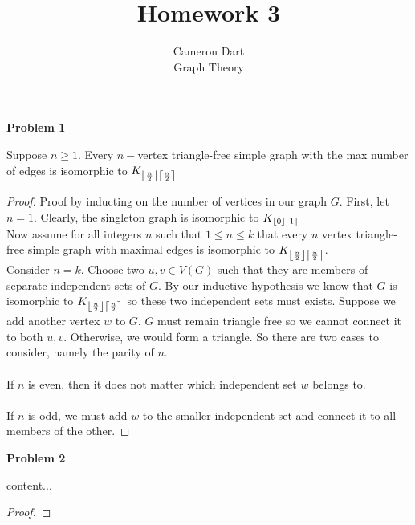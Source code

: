 \documentclass{article}
\newcommand{\K}[2]{K_{\floor*{#1} \ceil*{#2}}}
\DeclarePairedDelimiter\ceil{\lceil}{\rceil}
\DeclarePairedDelimiter\floor{\lfloor}{\rfloor}
\newenvironment{claim}[2][Claim]{\begin{trivlist}
		\item[\hskip \labelsep {\bfseries #1}\hskip \labelsep {\bfseries #2}]}{\end{trivlist}}
\begin{document}
\title{Homework 3} 
\author{Cameron Dart\\ Graph Theory} 

\maketitle

\noindent \textbf{Problem 1}
\begin{claim}{}
	Suppose $n \geq 1$. Every $n-$vertex triangle-free simple graph with the max number of edges is isomorphic to $\K{\frac{n}{2}}{\frac{n}{2}}$ 
\end{claim}
\begin{proof}
	Proof by inducting on the number of vertices in our graph $G$.
	First, let $n = 1$.  Clearly, the singleton graph is isomorphic to $\K{0}{1}$\\
	Now assume for all integers $n$ such that $1 \leq n \leq k$ that every $n$ vertex triangle-free simple graph with maximal edges is isomorphic to $\K{\frac{n}{2}}{\frac{n}{2}}$.\\
	Consider $n = k$. Choose two $u,v \in V(G)$ such that they are members of separate independent sets of $G$. By our inductive hypothesis we know that  $G$ is isomorphic to $\K{\frac{n}{2}}{\frac{n}{2}}$ so these two independent sets must exists. Suppose we add another vertex $w$ to $G$. $G$ must remain triangle free so we cannot connect it to both $u,v$. Otherwise, we would form a triangle. So there are two cases to consider, namely the parity of $n$.\\ \\
	If $n$ is even, then it does not matter which independent set $w$ belongs to. \\ \\
	If $n$ is odd, we must add $w$ to the smaller independent set and connect it to all members of the other.
\end{proof}

\noindent \textbf{Problem 2}
\begin{claim}{}
	content...
\end{claim}
\begin{proof}
\end{proof}
\end{document}
